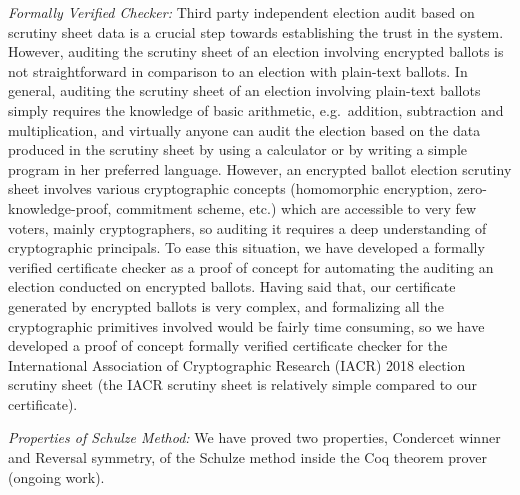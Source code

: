 \noindent 
\textit{Formally Verified Checker:} Third party independent election audit based on scrutiny sheet data is a crucial step towards 
establishing the trust in the system.   However, auditing the scrutiny sheet of an election involving encrypted ballots
is not straightforward in comparison to an election with plain-text ballots. 
In general, auditing the scrutiny sheet of an election involving 
plain-text ballots simply requires the knowledge of basic arithmetic, e.g.~addition, subtraction and multiplication, 
and virtually anyone can audit the election based on the data produced in the scrutiny sheet by
using a calculator or by writing a simple program in her preferred language. 
However, an encrypted ballot election scrutiny sheet involves various
cryptographic concepts (homomorphic encryption, zero-knowledge-proof, commitment scheme, etc.) 
which are accessible to very few voters, mainly cryptographers,  so auditing it 
requires a deep understanding of cryptographic principals. To ease this situation, we have developed a formally verified 
certificate checker as a proof of concept for automating the auditing an election conducted on encrypted ballots. 
Having said that,  our certificate generated by encrypted ballots is very complex, and formalizing all the cryptographic 
primitives involved would be fairly time consuming, so we have developed a proof of concept 
formally verified certificate checker for the International Association of Cryptographic Research (IACR) 2018 election
scrutiny sheet (the IACR scrutiny sheet is relatively simple compared to our certificate).

\noindent
\textit{Properties of Schulze Method:} We have proved two properties, Condercet winner and Reversal symmetry, 
of the Schulze method inside the Coq theorem prover (ongoing work).
 


